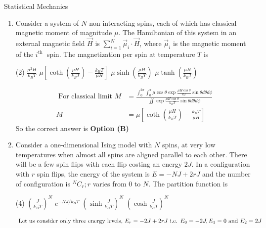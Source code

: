 \begin{abox}
	Statistical Mechanics
\end{abox}
\begin{enumerate}
	\item Consider a system of $N$ non-interacting spins, each of which has classical magnetic moment of magnitude $\mu$. The Hamiltonian of this system in an external magnetic field $\vec{H}$ is $\sum_{i=1}^{N} \vec{\mu}_{i} \cdot \vec{H}$, where $\vec{\mu}_{i}$ is the magnetic moment of the $i^{\text {th }}$ spin. The magnetization per spin at temperature $T$ is
\begin{tasks}(2)
\task[\textbf{A.}] $\frac{\mu^{2} H}{k_{B} T}$
\task[\textbf{B.}] $\mu\left[\operatorname{coth}\left(\frac{\mu H}{k_{B} T}\right)-\frac{k_{B} T}{\mu H}\right]$
\task[\textbf{C.}]  $\mu \sinh \left(\frac{\mu H}{k_{B} T}\right)$
\task[\textbf{D.}]  $\mu \tanh \left(\frac{\mu H}{k_{B} T}\right)$
\end{tasks}
\begin{answer}
\begin{align*}
\text{	For classical limit }M&=\frac{\int_{0}^{2 \pi} \int_{0}^{\pi} \mu \cos \theta \exp \frac{\mu H \cos \theta}{k T} \sin \theta d \theta d \phi}{\iint \exp \frac{\mu H \cos \theta}{k_{B} T} \sin \theta d \theta d \phi}\\
M&=\mu\left[\operatorname{coth}\left(\frac{\mu H}{k_{B} T}\right)-\frac{k_{B} T}{\mu H}\right]
\end{align*}
So the correct answer is \textbf{Option (B)}
\end{answer}
	\item  Consider a one-dimensional Ising model with $N$ spins, at very low temperatures when almost all spins are aligned parallel to each other. There will be a few spin flips with each flip costing an energy $2 J .$ In a configuration with $r$ spin flips, the energy of the system is $E=-N J+2 r J$ and the number of configuration is ${ }^{N} C_{r} ; r$ varies from 0 to $N$. The partition function is
\begin{tasks}(4)
\task[\textbf{A.}] $\left(\frac{J}{k_{B} T}\right)^{N}$
\task[\textbf{B.}]  $e^{-N J / k_{B} T}$
\task[\textbf{C.}] $\left(\sinh \frac{J}{k_{B} T}\right)^{N}$
\task[\textbf{D.}] $\left(\cosh \frac{J}{k_{B} T}\right)^{N}$
\end{tasks}
\begin{answer}
\begin{align*}
\intertext{ Let us consider only three energy levels, $E_{r}=-2 J+2 r J$ i.e. $E_{0}=-2 J, E_{1}=0$ and $E_{2}=2 J$ }

\end{align*}
\end{answer}
\end{enumerate}
